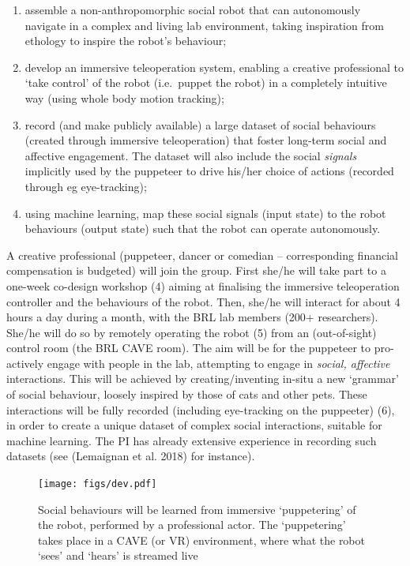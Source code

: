 \documentclass[11pt,a4paper]{report}
\begin{document}
\begin{enumerate}
\def\labelenumi{\arabic{enumi}.}
\item
  assemble a non-anthropomorphic social robot that can autonomously
  navigate in a complex and living lab environment, taking inspiration
  from ethology to inspire the robot's behaviour;
\item
  develop an immersive teleoperation system, enabling a creative
  professional to `take control' of the robot (i.e.~puppet the robot) in
  a completely intuitive way (using whole body motion tracking);
\item
  record (and make publicly available) a large dataset of social
  behaviours (created through immersive teleoperation) that foster
  long-term social and affective engagement. The dataset will also
  include the social \emph{signals} implicitly used by the puppeteer to
  drive his/her choice of actions (recorded through eg eye-tracking);
\item
  using machine learning, map these social signals (input state) to the
  robot behaviours (output state) such that the robot can operate
  autonomously.
\end{enumerate}

A creative professional (puppeteer, dancer or comedian --
corresponding financial compensation is budgeted) will join the group.
First she/he will take part to a one-week co-design workshop (4) aiming
at finalising the immersive teleoperation controller and the behaviours
of the robot. Then, she/he will interact for about 4 hours a day during
a month, with the BRL lab members (200+ researchers). She/he will do so
by remotely operating the robot (5) from an (out-of-sight) control room
(the BRL CAVE room). The aim will be for the puppeteer to pro-actively
engage with people in the lab, attempting to engage in \emph{social,
affective} interactions. This will be achieved by creating/inventing
in-situ a new `grammar' of social behaviour, loosely inspired by those
of cats and other pets. These interactions will be fully recorded
(including eye-tracking on the puppeeter) (6), in order to create a
unique dataset of complex social interactions, suitable for machine
learning. The PI has already extensive experience in recording such
datasets (see (Lemaignan et al. 2018) for instance).

\begin{figure}
    \centering
    \texttt{[image: figs/dev.pdf]}
    \caption{\label{fig:support}
    Social behaviours will be learned from immersive `puppetering' of the
    robot, performed by a professional actor. The `puppetering' takes place
    in a CAVE (or VR) environment, where what the robot `sees' and `hears'
    is streamed live}
\end{figure}
\end{document}
